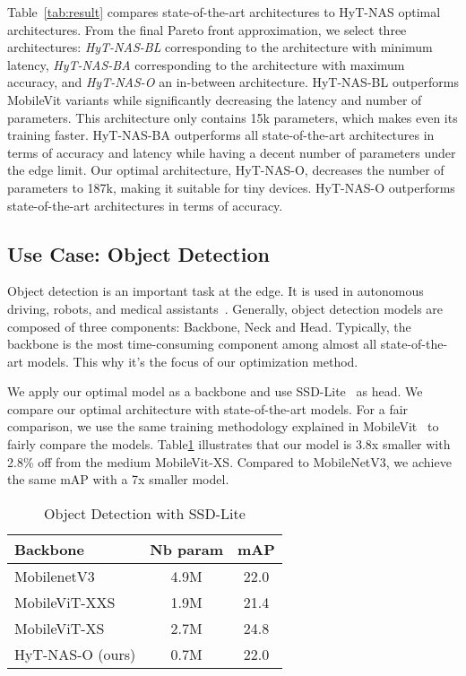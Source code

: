 \documentclass[conference]{IEEEtran}
\begin{document}
Table~\ref{tab:result} compares state-of-the-art architectures to HyT-NAS optimal architectures. From the final Pareto front approximation, we select three architectures: \textit{HyT-NAS-BL} corresponding to the architecture with minimum latency, \textit{HyT-NAS-BA} corresponding to the architecture with maximum accuracy, and \textit{HyT-NAS-O} an in-between architecture. HyT-NAS-BL outperforms MobileVit variants while significantly decreasing the latency and number of parameters. This architecture only contains 15k parameters, which makes even its training faster. HyT-NAS-BA outperforms all state-of-the-art architectures in terms of accuracy and latency while having a decent number of parameters under the edge limit. Our optimal architecture, HyT-NAS-O, decreases the number of parameters to 187k, making it suitable for tiny devices. HyT-NAS-O outperforms state-of-the-art architectures in terms of accuracy. 







\subsection{Use Case: Object Detection }\label{sec:od}
Object detection is an important task at the edge. It is used in autonomous driving, robots, and medical assistants~\cite{DBLP:conf/icra/Munoz-MartinezVGFSGTJ00}. Generally, object detection models are composed of three components: Backbone, Neck and Head.
Typically, the backbone is the most time-consuming component among almost all state-of-the-art models. This why it's the focus of our optimization method.





We apply our optimal model as a backbone and use SSD-Lite~\cite{DBLP:conf/eccv/LiuAESRFB16} as head. We compare our optimal architecture with state-of-the-art models. For a fair comparison, we use the same training methodology explained in MobileVit~\cite{mobilevit} to fairly compare the models. Table\ref{tab:odresults} illustrates that our model is 3.8x smaller with 2.8\% off from the medium MobileVit-XS. Compared to MobileNetV3, we achieve the same mAP with a 7x smaller model.  

\begin{table}[H]
    \centering
    \begin{tabular}{p{3cm}|c|c}
    \hline
         Backbone & Nb param & mAP \\ \hline
         MobilenetV3 & 4.9M & 22.0 \\
         MobileViT-XXS & 1.9M& 21.4 \\ 
         MobileViT-XS  & 2.7M & 24.8 \\
         HyT-NAS-O (ours) & 0.7M & 22.0\\ \hline
    \end{tabular}
    \caption{Object Detection with SSD-Lite}
    \label{tab:odresults}
\end{table}
\end{document}

